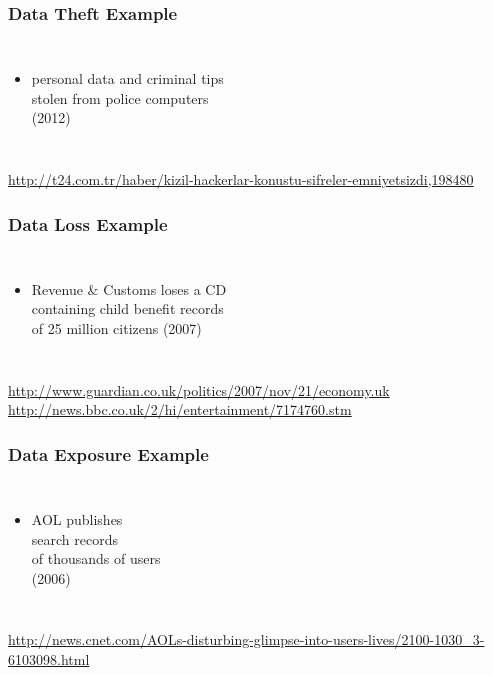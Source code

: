 \documentclass[dvipsnames]{beamer}
\theoremstyle{plain}
\begin{document}
\begin{frame}
  \frametitle{Data Theft Example}

  \begin{columns}

    \begin{itemize}
      \item personal data and criminal tips\\
        stolen from police computers\\
        (2012)
    \end{itemize}
  \end{columns}

  \medskip
  \tiny{\url{http://t24.com.tr/haber/kizil-hackerlar-konustu-sifreler-emniyetsizdi,198480}}\\
\end{frame}

\begin{frame}
  \frametitle{Data Loss Example}

  \begin{columns}

    \begin{itemize}
      \item Revenue \& Customs loses a CD\\
        containing child benefit records\\
        of 25 million citizens (2007)
    \end{itemize}
  \end{columns}

  \medskip
  \tiny{\url{http://www.guardian.co.uk/politics/2007/nov/21/economy.uk}}\\
  \smallskip
  \tiny{\url{http://news.bbc.co.uk/2/hi/entertainment/7174760.stm}}\\
\end{frame}

\begin{frame}
  \frametitle{Data Exposure Example}

  \begin{columns}

    \begin{itemize}
      \item AOL publishes\\
        search records\\
        of thousands of users\\
        (2006)
    \end{itemize}
  \end{columns}

  \medskip
  \tiny{\url{http://news.cnet.com/AOLs-disturbing-glimpse-into-users-lives/2100-1030_3-6103098.html}}\\
\end{frame}
\end{document}
